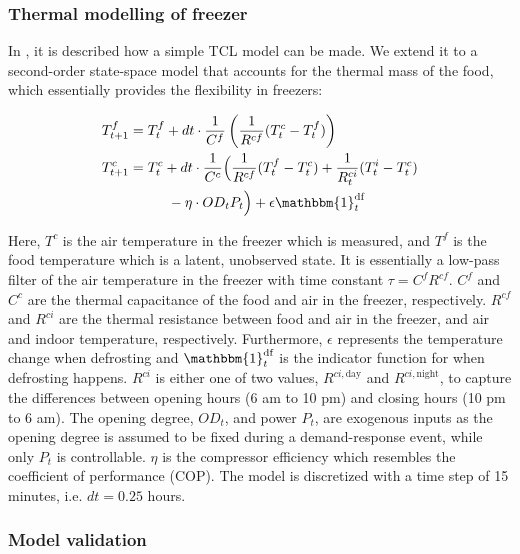 \subsubsection{Thermal modelling of freezer}

In \cite{hao2014aggregate}, it is described how a simple TCL model can be made. We extend it to a second-order state-space model that accounts for the thermal mass of the food, which essentially provides the flexibility in freezers:

\begin{subequations}\label{eq:2ndFreezerStateSpace}
    \begin{align}
        T^{f}_{t+1} & = T^{f}_{t} + dt \cdot \frac{1}{C^f}\left(\frac{1}{R^{cf}} (T^{c}_{t} - T^{f}_{t}) \right)                                                                              \\
        T^{c}_{t+1} & = T^{c}_t + dt \cdot \frac{1}{C^c}\Bigl(\frac{1}{R^{cf}} (T^{f}_t - T^{c}_t) + \frac{1}{R^{ci}_{t}} (T^{i}_t - T^{c}_t)                                          \notag \\ & \mspace{50mu} - \eta \cdot OD_t P_t \Bigr) + \epsilon \mathbbm{1}^{\text{df}}_{t}
    \end{align}
\end{subequations}

Here, $T^c$ is the air temperature in the freezer which is measured, and $T^f$ is the food temperature which is a latent, unobserved state. It is essentially a low-pass filter of the air temperature in the freezer with time constant $\tau = C^f R^{cf}$. $C^f$ and $C^c$ are the thermal capacitance of the food and air in the freezer, respectively. $R^{cf}$ and $R^{ci}$ are the thermal resistance between food and air in the freezer, and air and indoor temperature, respectively. Furthermore, $\epsilon$ represents the temperature change when defrosting and $\mathbbm{1}^{\text{df}}_{t}$ is the indicator function for when defrosting happens. $R^{ci}$ is either one of two values, $R^{ci, \text{day}}$ and $R^{ci, \text{night}}$, to capture the differences between opening hours (6 am to 10 pm) and closing hours (10 pm to 6 am). The opening degree, $OD_t$, and power $P_t$, are exogenous inputs as the opening degree is assumed to be fixed during a demand-response event, while only $P_t$ is controllable. $\eta$ is the compressor efficiency which resembles the coefficient of performance (COP). The model is discretized with a time step of 15 minutes, i.e. $dt = 0.25$ hours.

\subsubsection{Model validation}

